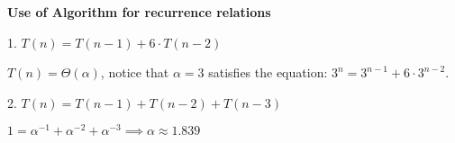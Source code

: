 \begin{example}
    \textbf{Use of Algorithm for recurrence relations}

    1. $T(n) = T(n-1) + 6 \cdot T(n-2)$

    $T(n) = \Theta(\alpha)$, notice that $\alpha = 3$ satisfies the equation: $3^n = 3^{n-1} + 6 \cdot 3^{n-2}$.

    2. $T(n) = T(n-1) + T(n-2) + T(n-3)$

    $1 = \alpha^{-1} + \alpha^{-2} + \alpha^{-3} \implies \alpha \approx 1.839$


\end{example}